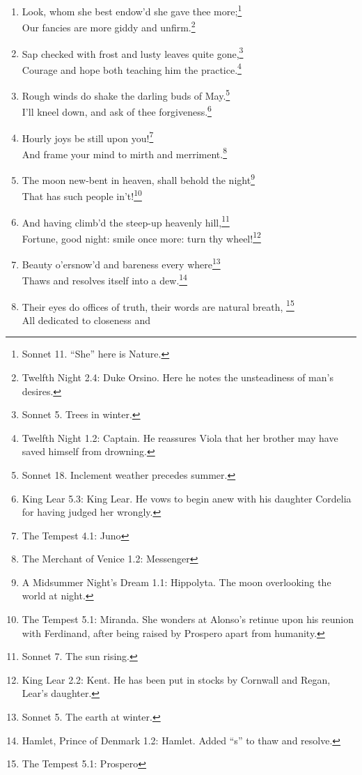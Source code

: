 \documentclass[17pt,twoside]{extarticle}
\begin{document}
\begin{enumerate}
  of nothing but vain fantasy.\footnote{Romeo and Juliet 1.4: Mercutio.
    ``I talk of dreams.''}
\item
  Look, whom she best endow'd she gave thee more;\footnote{Sonnet 11.
    ``She'' here is Nature.}\\Our fancies are more giddy and
  unfirm.\footnote{Twelfth Night 2.4: Duke Orsino. Here he notes the
    unsteadiness of man's desires.}
\item
  Sap checked with frost and lusty leaves quite gone,\footnote{Sonnet 5.
    Trees in winter.}\\Courage and hope both teaching him the
  practice.\footnote{Twelfth Night 1.2: Captain. He reassures Viola that
    her brother may have saved himself from drowning.}
\item
  Rough winds do shake the darling buds of May.\footnote{Sonnet 18.
    Inclement weather precedes summer.}\\I'll kneel down, and ask of
  thee forgiveness.\footnote{King Lear 5.3: King Lear. He vows to begin
    anew with his daughter Cordelia for having judged her wrongly.}
\item
  Hourly joys be still upon you!\footnote{The Tempest 4.1: Juno}\\And
  frame your mind to mirth and merriment.\footnote{The Merchant of
    Venice 1.2: Messenger}
\item
  The moon new-bent in heaven, shall behold the night\footnote{A
    Midsummer Night's Dream 1.1: Hippolyta. The moon overlooking the
    world at night.}\\That has such people in't!\footnote{The Tempest
    5.1: Miranda. She wonders at Alonso's retinue upon his reunion with
    Ferdinand, after being raised by Prospero apart from humanity.}
\item
  And having climb'd the steep-up heavenly hill,\footnote{Sonnet 7. The
    sun rising.}\\Fortune, good night: smile once more: turn thy
  wheel!\footnote{King Lear 2.2: Kent. He has been put in stocks by
    Cornwall and Regan, Lear's daughter.}
\item
  Beauty o'ersnow'd and bareness every where\footnote{Sonnet 5. The
    earth at winter.}\\Thaws and resolves itself into a dew.\footnote{Hamlet,
    Prince of Denmark 1.2: Hamlet. Added ``s'' to thaw and resolve.}
\item
  Their eyes do offices of truth, their words are natural breath,
  \footnote{The Tempest 5.1: Prospero}\\All dedicated to closeness and

\end{enumerate}
\end{document}
